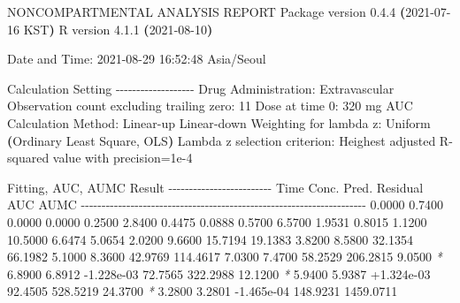 \documentclass[
  11pt,
  krantz2, a4paper, twoside]{krantz}
\newenvironment{Shaded}{\begin{snugshade}}{\end{snugshade}}
\newcommand{\AttributeTok}[1]{\textcolor[rgb]{0.77,0.63,0.00}{#1}}
\newcommand{\ErrorTok}[1]{\textcolor[rgb]{0.64,0.00,0.00}{\textbf{#1}}}
\newcommand{\ExtensionTok}[1]{#1}
\newcommand{\KeywordTok}[1]{\textcolor[rgb]{0.13,0.29,0.53}{\textbf{#1}}}
\newcommand{\NormalTok}[1]{#1}
\newcommand{\PreprocessorTok}[1]{\textcolor[rgb]{0.56,0.35,0.01}{\textit{#1}}}
\theoremstyle{definition}
\theoremstyle{definition}
\theoremstyle{definition}
\theoremstyle{definition}
\theoremstyle{remark}
\begin{document}
\small

\begin{Shaded}
\begin{Highlighting}[]
                        \ExtensionTok{NONCOMPARTMENTAL}\NormalTok{ ANALYSIS REPORT}
                       \ExtensionTok{Package}\NormalTok{ version 0.4.4 }\ErrorTok{(}\ExtensionTok{2021{-}07{-}16}\NormalTok{ KST}\KeywordTok{)}
                          \ExtensionTok{R}\NormalTok{ version 4.1.1 }\ErrorTok{(}\ExtensionTok{2021{-}08{-}10}\KeywordTok{)}

\ExtensionTok{Date}\NormalTok{ and Time: 2021{-}08{-}29 16:52:48 Asia/Seoul}

\ExtensionTok{Calculation}\NormalTok{ Setting}
\ExtensionTok{{-}{-}{-}{-}{-}{-}{-}{-}{-}{-}{-}{-}{-}{-}{-}{-}{-}{-}{-}}
\ExtensionTok{Drug}\NormalTok{ Administration: Extravascular}
\ExtensionTok{Observation}\NormalTok{ count excluding trailing zero: 11}
\ExtensionTok{Dose}\NormalTok{ at time 0: 320 mg}
\ExtensionTok{AUC}\NormalTok{ Calculation Method: Linear{-}up Linear{-}down}
\ExtensionTok{Weighting}\NormalTok{ for lambda z: Uniform }\ErrorTok{(}\ExtensionTok{Ordinary}\NormalTok{ Least Square, OLS}\KeywordTok{)}
\ExtensionTok{Lambda}\NormalTok{ z selection criterion: Heighest adjusted R{-}squared value with precision=1e{-}4}


\ExtensionTok{Fitting,}\NormalTok{ AUC, AUMC Result}
\ExtensionTok{{-}{-}{-}{-}{-}{-}{-}{-}{-}{-}{-}{-}{-}{-}{-}{-}{-}{-}{-}{-}{-}{-}{-}{-}{-}}
      \ExtensionTok{Time}\NormalTok{         Conc.      Pred.   Residual       AUC       AUMC}
\ExtensionTok{{-}{-}{-}{-}{-}{-}{-}{-}{-}{-}{-}{-}{-}{-}{-}{-}{-}{-}{-}{-}{-}{-}{-}{-}{-}{-}{-}{-}{-}{-}{-}{-}{-}{-}{-}{-}{-}{-}{-}{-}{-}{-}{-}{-}{-}{-}{-}{-}{-}{-}{-}{-}{-}{-}{-}{-}{-}{-}{-}{-}{-}{-}{-}{-}{-}{-}{-}{-}{-}}
     \ExtensionTok{0.0000}\NormalTok{       0.7400                           0.0000     0.0000}
     \ExtensionTok{0.2500}\NormalTok{       2.8400                           0.4475     0.0888}
     \ExtensionTok{0.5700}\NormalTok{       6.5700                           1.9531     0.8015}
     \ExtensionTok{1.1200}\NormalTok{      10.5000                           6.6474     5.0654}
     \ExtensionTok{2.0200}\NormalTok{       9.6600                          15.7194    19.1383}
     \ExtensionTok{3.8200}\NormalTok{       8.5800                          32.1354    66.1982}
     \ExtensionTok{5.1000}\NormalTok{       8.3600                          42.9769   114.4617}
     \ExtensionTok{7.0300}\NormalTok{       7.4700                          58.2529   206.2815}
     \ExtensionTok{9.0500} \PreprocessorTok{*}\NormalTok{     6.8900     6.8912 }\AttributeTok{{-}1.228e{-}03}\NormalTok{    72.7565   322.2988}
    \ExtensionTok{12.1200} \PreprocessorTok{*}\NormalTok{     5.9400     5.9387 +1.324e{-}03    92.4505   528.5219}
    \ExtensionTok{24.3700} \PreprocessorTok{*}\NormalTok{     3.2800     3.2801 }\AttributeTok{{-}1.465e{-}04}\NormalTok{   148.9231  1459.0711}


\end{Highlighting}
\end{Shaded}
\end{document}
